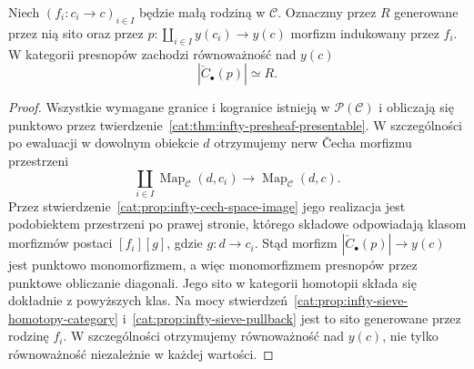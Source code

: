 \begin{stwierdzenie}\label{cat:prop:infty-cech-sieve}
Niech $(f_i:c_i\to c)_{i\in I}$ będzie małą rodziną w $\mathcal C$. Oznaczmy przez $R$ generowane przez nią sito oraz przez $p:\coprod_{i\in I}y(c_i)\to y(c)$ morfizm indukowany przez $f_i$. W kategorii presnopów zachodzi równoważność nad $y(c)$
\[
 |\check C_\bullet(p)|\simeq R.
\]
\end{stwierdzenie}
\begin{proof}
Wszystkie wymagane granice i kogranice istnieją w $\mathcal P(\mathcal C)$ i obliczają się punktowo przez twierdzenie~\ref{cat:thm:infty-presheaf-presentable}. W szczególności po ewaluacji w dowolnym obiekcie $d$ otrzymujemy nerw Čecha morfizmu przestrzeni
\[
 \coprod_{i\in I}\operatorname{Map}_{\mathcal C}(d,c_i)
 \longrightarrow\operatorname{Map}_{\mathcal C}(d,c).
\]
Przez stwierdzenie~\ref{cat:prop:infty-cech-space-image} jego realizacja jest podobiektem przestrzeni po prawej stronie, którego składowe odpowiadają klasom morfizmów postaci $[f_i][g]$, gdzie $g:d\to c_i$. Stąd morfizm $|\check C_\bullet(p)|\to y(c)$ jest punktowo monomorfizmem, a więc monomorfizmem presnopów przez punktowe obliczanie diagonali. Jego sito w kategorii homotopii składa się dokładnie z powyższych klas. Na mocy stwierdzeń~\ref{cat:prop:infty-sieve-homotopy-category} i~\ref{cat:prop:infty-sieve-pullback} jest to sito generowane przez rodzinę $f_i$. W szczególności otrzymujemy równoważność nad $y(c)$, nie tylko równoważność niezależnie w każdej wartości.
\end{proof}

